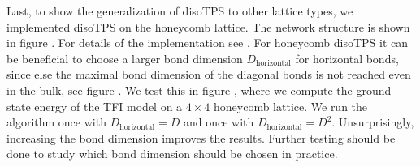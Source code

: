 

Last, to show the generalization of disoTPS to other lattice types, we implemented disoTPS on the honeycomb lattice. The network structure is shown in figure \figref{}. For details of the implementation see \cite{}. For honeycomb disoTPS it can be beneficial to choose a larger bond dimension $D_\text{horizontal}$ for horizontal bonds, since else the maximal bond dimension of the diagonal bonds is not reached even in the bulk, see figure \figref{}. We test this in figure \figref{}, where we compute the ground state energy of the TFI model on a $4\times4$ honeycomb lattice. We run the algorithm once with $D_\text{horizontal} = D$ and once with $D_\text{horizontal} = D^2$. Unsurprisingly, increasing the bond dimension improves the results. Further testing should be done to study which bond dimension should be chosen in practice.
